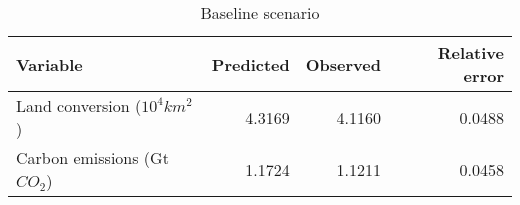 \begin{table}
\centering
\caption{\label{tab:baseline}Baseline scenario}
\centering
\begin{tabular}[t]{lrrr}
\midrule\midrule
Variable & Predicted & Observed & Relative error\\
\midrule
Land conversion ($10^4 km^2$) & 4.3169 & 4.1160 & 0.0488\\
\addlinespace
Carbon emissions (Gt $CO_2$) & 1.1724 & 1.1211 & 0.0458\\
\bottomrule
\end{tabular}
\end{table}
